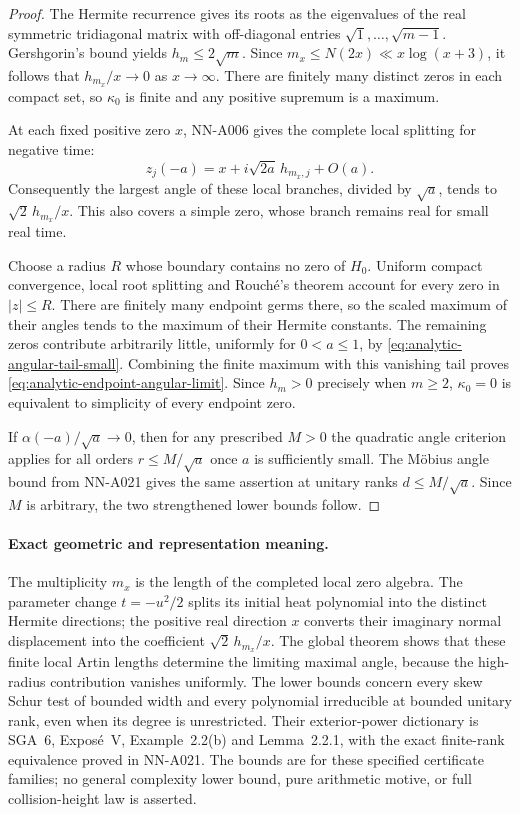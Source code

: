 \begin{proof}
The Hermite recurrence gives its roots as the eigenvalues of
the real symmetric tridiagonal matrix with off-diagonal
entries $\sqrt1,\ldots,\sqrt{m-1}$. Gershgorin's bound yields
$h_m\le2\sqrt m$. Since
$m_x\le N(2x)\ll x\log(x+3)$, it follows that
$h_{m_x}/x\to0$ as $x\to\infty$. There are finitely many
distinct zeros in each compact set, so $\kappa_0$ is finite
and any positive supremum is a maximum.

At each fixed positive zero $x$, NN-A006 gives the complete
local splitting for negative time:
\[
             z_j(-a)=x+i\sqrt{2a}\,h_{m_x,j}+O(a).
\]
Consequently the largest angle of these local branches,
divided by $\sqrt a$, tends to $\sqrt2\,h_{m_x}/x$.
This also covers a simple zero, whose branch remains real
for small real time.

Choose a radius $R$ whose boundary contains no zero of $H_0$.
Uniform compact convergence, local root splitting and
Rouch\'e's theorem account for every zero in $|z|\le R$.
There are finitely many endpoint germs there, so the scaled
maximum of their angles tends to the maximum of their
Hermite constants. The remaining zeros contribute arbitrarily
little, uniformly for $0<a\le1$, by
\eqref{eq:analytic-angular-tail-small}. Combining the finite
maximum with this vanishing tail proves
\eqref{eq:analytic-endpoint-angular-limit}.
Since $h_m>0$ precisely when $m\ge2$, $\kappa_0=0$ is
equivalent to simplicity of every endpoint zero.

If $\alpha(-a)/\sqrt a\to0$, then for any prescribed $M>0$
the quadratic angle criterion applies for all orders
$r\le M/\sqrt a$ once $a$ is sufficiently small. The
M\"obius angle bound from NN-A021 gives the same assertion
at unitary ranks $d\le M/\sqrt a$. Since $M$ is arbitrary,
the two strengthened lower bounds follow.
\end{proof}

\paragraph{Exact geometric and representation meaning.}
The multiplicity $m_x$ is the length of the completed local
zero algebra. The parameter change $t=-u^2/2$ splits its
initial heat polynomial into the distinct Hermite directions;
the positive real direction $x$ converts their imaginary
normal displacement into the coefficient
$\sqrt2\,h_{m_x}/x$. The global theorem shows that these
finite local Artin lengths determine the limiting maximal
angle, because the high-radius contribution vanishes uniformly.
The lower bounds concern every skew Schur test of bounded
width and every polynomial irreducible at bounded unitary
rank, even when its degree is unrestricted. Their
exterior-power dictionary is SGA~6, Expos\'e~V,
Example~2.2(b) and Lemma~2.2.1, with the exact finite-rank
equivalence proved in NN-A021. The bounds are for these
specified certificate families; no general complexity lower
bound, pure arithmetic motive, or full collision-height law
is asserted.


